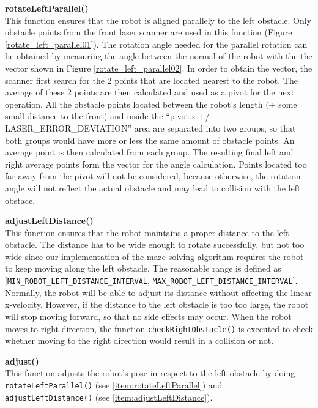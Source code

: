 \begin{description}
\item \textbf{rotateLeftParallel()} \label{item:rotateLeftParallel} \hfill \\
This function ensures that the robot is aligned parallely to the left obstacle. Only obstacle points from the front laser scanner are used in this function (Figure \ref{rotate_left_parallel01}). The rotation angle needed for the parallel rotation can be obtained by measuring the angle between the normal of the robot with the the vector shown in Figure \ref{rotate_left_parallel02}. In order to obtain the vector, the scanner first search for the 2 points that are located nearest to the robot. The average of these 2 points are then calculated and used as a pivot for the next operation. All the obstacle points located between the robot's length (+ some small distance to the front) and inside the ``pivot.x +/- LASER\_ERROR\_DEVIATION'' area are separated into two groups, so that both groups would have more or less the same amount of obstacle points. An average point is then calculated from each group. The resulting final left and right average points form the vector for the angle calculation. Points located too far away from the pivot will not be considered, because otherwise, the rotation angle will not reflect the actual obstacle and may lead to collision with the left obstace.

\item \textbf{adjustLeftDistance()} \label{item:adjustLeftDistance} \hfill \\
This function ensures that the robot maintains a proper distance to the left obstacle. The distance has to be wide enough to rotate successfully, but not too wide since our implementation of the maze-solving algorithm requires the robot to keep moving along the left obstacle. The reasonable range is defined as [\texttt{MIN\_ROBOT\_LEFT\_DISTANCE\_INTERVAL}, \texttt{MAX\_ROBOT\_LEFT\_DISTANCE\_INTERVAL}]. Normally, the robot will be able to adjust its distance without affecting the linear x-velocity. However, if the distance to the left obstacle is too too large, the robot will stop moving forward, so that no side effects may occur. When the robot moves to right direction, the function \texttt{checkRightObstacle()} is executed to check whether moving to the right direction would result in a collision or not. 

\item \textbf{adjust()} \hfill \\
This function adjusts the robot's pose in respect to the left obstacle by doing \texttt{rotateLeftParallel()} (see \ref{item:rotateLeftParallel}) and \\ \texttt{adjustLeftDistance()} (see \ref{item:adjustLeftDistance}).


\end{description}
